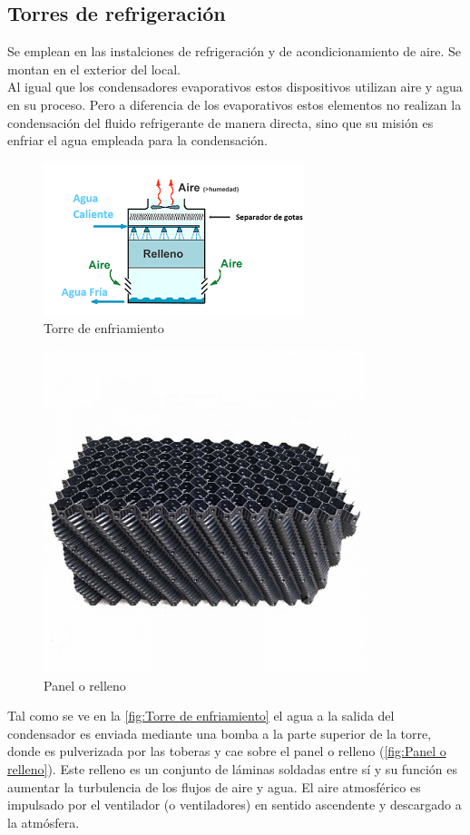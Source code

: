 \subsection{Torres de refrigeraci\'on}
Se emplean en las instalciones de refrigeraci\'on y de acondicionamiento de aire. Se montan en el exterior del local.\\ Al igual que los condensadores evaporativos estos dispositivos utilizan aire y agua en su proceso. Pero a diferencia de los evaporativos estos elementos no realizan la condensaci\'on del fluido refrigerante de manera directa, sino que su misi\'on es enfriar el agua empleada para la condensaci\'on.
\begin{figure}[H]
    \centering
    \includegraphics[width=.6\linewidth]{figuras/condensadores/torre de enfriamiento.png}
    \caption{Torre de enfriamiento}
    \label{fig:Torre de enfriamiento}
\end{figure}
\begin{figure}
    \centering
    \includegraphics[width=0.6\linewidth]{figuras/condensadores/relleno.jpg}
    \caption{Panel o relleno}
    \label{fig:Panel o relleno}
\end{figure}
Tal como se ve en la \autoref{fig:Torre de enfriamiento} el agua a la salida del condensador es enviada mediante una bomba a la parte superior de la torre, donde es pulverizada por las toberas y cae sobre el panel o relleno (\autoref{fig:Panel o relleno}). Este relleno es un conjunto de l\'aminas soldadas entre s\'i y su funci\'on es aumentar la turbulencia de los flujos de aire y agua. El aire atmosf\'erico es impulsado por el ventilador (o ventiladores) en sentido ascendente y descargado a la atm\'osfera.\\
